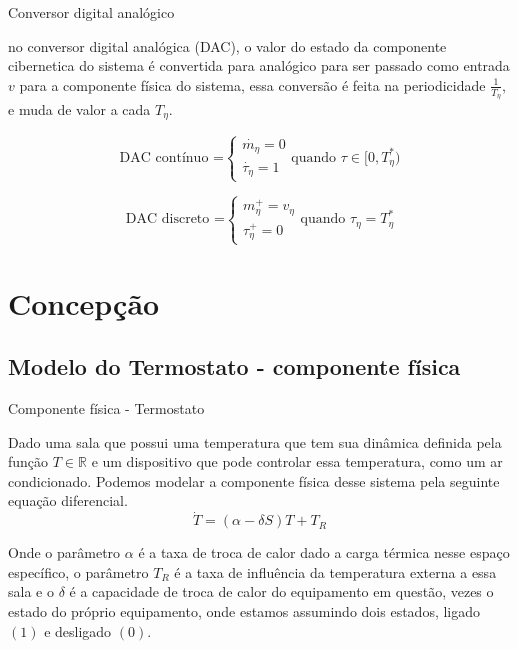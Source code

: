 \documentclass{beamer}
\begin{document}
\begin{frame}{Conversor digital analógico}
	\par no conversor digital analógica (DAC), o valor do estado da componente cibernetica do sistema é convertida para analógico para ser passado como entrada $v$ para a componente física do sistema, essa conversão é feita na periodicidade $\frac{1}{T_\eta}$, e muda de valor a cada $T_\eta$.
	
	\begin{equation}
		\text{DAC contínuo =}
		\begin{cases}
			\dot{m_{\eta}}=0\\
			\dot{\tau_{\eta}}=1
		\end{cases}
		\text{quando $\tau \in [0,T_{\eta}^{*})$}
	\end{equation}
	
	\begin{equation}
		\text{DAC discreto =}
		\begin{cases}
			m_{\eta}^{+}=v_{\eta}\\
			\tau_{\eta}^{+}=0
		\end{cases}
		\text{quando $\tau_\eta = T_\eta^{*}$}
	\end{equation}
\end{frame}

\section{Concepção}

\subsection{Modelo do Termostato - componente física}

\begin{frame}{Componente física - Termostato}
	\par Dado uma sala que possui uma temperatura que tem sua dinâmica definida pela função $T \in \mathbb{R}$ e um dispositivo que pode controlar essa temperatura, como um ar condicionado.
	Podemos modelar a componente física desse sistema pela seguinte equação diferencial.\cite{afroz_modeling_2018}
	\begin{equation}
		\dot{T} = (\alpha - \delta S) T + T_R
	\end{equation}
	\par Onde o parâmetro $\alpha$ é a taxa de troca de calor dado a carga térmica nesse espaço específico, o parâmetro $T_R$ é a taxa de influência da temperatura externa a essa sala e o $\delta$ é a capacidade de troca de calor do equipamento em questão, vezes o estado do próprio equipamento, onde estamos assumindo dois estados, ligado $(1)$ e desligado $(0)$.
\end{frame}
\end{document}
